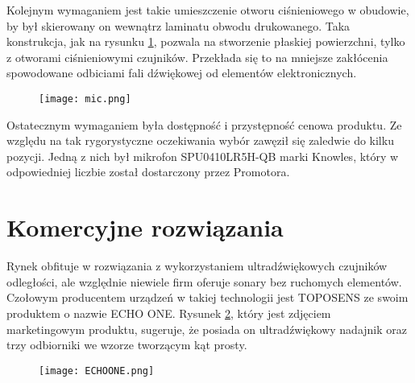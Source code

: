 \noindent
\vspace{2cm}

Kolejnym wymaganiem jest takie umieszczenie otworu ciśnieniowego w obudowie, by był skierowany on wewnątrz laminatu obwodu drukowanego. 
Taka konstrukcja, jak na rysunku \ref{fig:mic}, pozwala na stworzenie płaskiej powierzchni, tylko z otworami ciśnieniowymi czujników. 
Przekłada się to na mniejsze zakłócenia spowodowane odbiciami fali dźwiękowej od elementów elektronicznych.

\begin{figure}[ht!]
    \centering
    \texttt{[image: mic.png]}
    \label{fig:mic}
\end{figure}
\noindent
Ostatecznym wymaganiem była dostępność i przystępność cenowa produktu. Ze względu na tak rygorystyczne oczekiwania wybór zawęził się zaledwie do kilku pozycji.
Jedną z nich był mikrofon SPU0410LR5H-QB marki Knowles\cite{knowles}, który w odpowiedniej liczbie został dostarczony przez Promotora.
\vspace{2cm}



\section{Komercyjne rozwiązania}
Rynek obfituje w rozwiązania z wykorzystaniem ultradźwiękowych czujników odległości, 
ale względnie niewiele firm oferuje sonary bez ruchomych elementów.
Czołowym producentem urządzeń w takiej technologii jest TOPOSENS ze swoim produktem o nazwie ECHO ONE\textregistered.
Rysunek \ref{fig:echoone}, który jest zdjęciem marketingowym produktu, sugeruje, 
że posiada on ultradźwiękowy nadajnik oraz trzy odbiorniki we wzorze tworzącym kąt prosty.

\begin{figure}[ht!]
    \centering
    \texttt{[image: ECHOONE.png]}
    \label{fig:echoone}
\end{figure}
